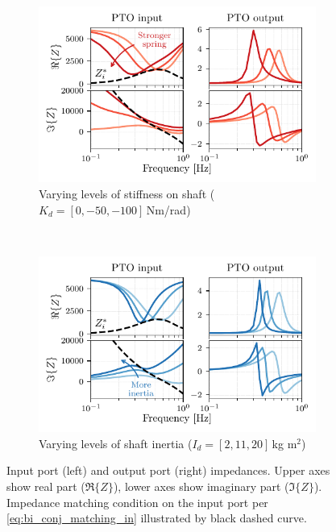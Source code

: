 \documentclass[lettersize,journal]{IEEEtran}
\begin{document}
\begin{figure}
     \centering
     \begin{subfigure}[b]{1\columnwidth}
         \centering
         \includegraphics[width=\textwidth]{wec_as_multiport_in_and_out_impedances_spring.pdf}
         \caption{Varying levels of stiffness on shaft ($K_d=[0, -50, -100]$\,Nm/rad)}
         \label{fig:wec_as_multiport_in_and_out_impedances_spring}
     \end{subfigure}
     \\
     \begin{subfigure}[b]{1\columnwidth}
         \centering
         \includegraphics[width=\textwidth]{wec_as_multiport_in_and_out_impedances_inertia.pdf}
         \caption{Varying levels of shaft inertia ($I_d=[2, 11, 20]$\,kg m$^2$)}
         \label{fig:wec_as_multiport_in_and_out_impedances_inertia}
     \end{subfigure}
     \caption{Input port (left) and output port (right) impedances. Upper axes show real part ($\Re \{ Z \}$), lower axes show imaginary part ($\Im \{ Z \}$). Impedance matching condition on the input port per \eqref{eq:bi_conj_matching_in} illustrated by black dashed curve.}
     \label{fig:wec_as_multiport_in_and_out_impedances}
\end{figure}
\end{document}
